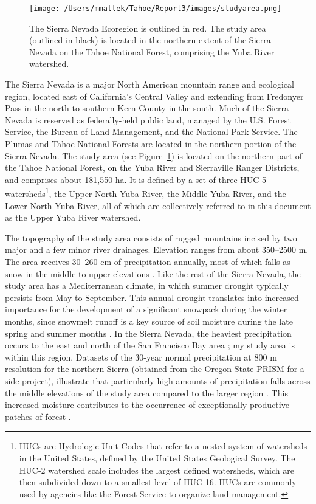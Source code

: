 \begin{figure}[!htbp]
\texttt{[image: /Users/mmallek/Tahoe/Report3/images/studyarea.png]}
\caption{The Sierra Nevada Ecoregion is outlined in red. The study area (outlined in black) is located in the northern extent of the Sierra Nevada on the Tahoe National Forest, comprising the Yuba River watershed.}
\label{projectarea}
\end{figure}

The Sierra Nevada is a major North American mountain range and ecological region, located east of California's Central Valley and extending from Fredonyer Pass in the north to southern Kern County in the south. Much of the Sierra Nevada is reserved as federally-held public land, managed by the U.S. Forest Service, the Bureau of Land Management, and the National Park Service. The Plumas and Tahoe National Forests are located in the northern portion of the Sierra Nevada. The study area (see Figure~\ref{projectarea}) is located on the northern part of the Tahoe National Forest, on the Yuba River and Sierraville Ranger Districts, and comprises about 181,550 ha. It is defined by a set of three HUC-5 watersheds\footnote{HUCs are Hydrologic Unit Codes that refer to a nested system of watersheds in the United States, defined by the United States Geological Survey. The HUC-2 watershed scale includes the largest defined watersheds, which are then subdivided down to a smallest level of HUC-16. HUCs are commonly used by agencies like the Forest Service to organize land management.}, the Upper North Yuba River, the Middle Yuba River, and the Lower North Yuba River, all of which are collectively referred to in this document as the Upper Yuba River watershed. 

The topography of the study area consists of rugged mountains incised by two major and a few minor river drainages. Elevation ranges from about 350--2500 m. The area receives 30--260 cm of precipitation annually, most of which falls as snow in the middle to upper elevations \citep{Storer1963}. Like the rest of the Sierra Nevada, the study area has a Mediterranean climate, in which summer drought typically persists from May to September. This annual drought translates into increased importance for the development of a significant snowpack during the winter months, since snowmelt runoff is a key source of soil moisture during the late spring and summer months \citep{Minnich2007,Skinner1996}. In the Sierra Nevada, the heaviest precipitation occurs to the east and north of the San Francisco Bay area \citep{VanWag2006}; my study area is within this region. Datasets of the 30-year normal precipitation at 800 m resolution for the northern Sierra (obtained from the Oregon State PRISM for a side project), illustrate that particularly high amounts of precipitation falls across the middle elevations of the study area compared to the larger region \citep{PRISMClimateGroup2004}. This increased moisture contributes to the occurrence of exceptionally productive patches of forest \citep[][ Alan Doerr, personal communication]{Littell2012}.




